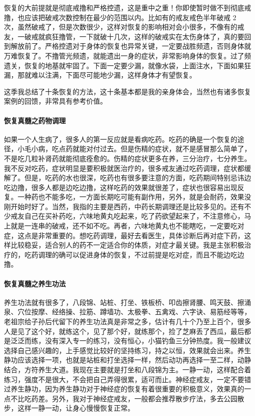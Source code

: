 恢复的大前提就是彻底戒撸和严格控遗，这是重中之重！你即使暂时做不到彻底戒撸，也应该把破戒次数控制在最少的范围以内。比如有的戒友戒色半年破戒 2 次，虽然破戒了，但是次数很少，这样对恢复的影响相对会小很多，不像有的戒友，一破戒就疯狂撸管，一下就破十几次，这样的破戒实在太伤身体了，真的要回到解放前了。严格控遗对于身体的恢复也异常关键，一定要战胜频遗，否则身体就万难恢复了。不撸管光频遗，就能遗出一身的症状，非常影响身体的恢复。过了频遗关，恢复的地基就牢固了。下面一定要少漏，就像水袋，上面注水，下面如果狂漏，那就难以注满，下面尽可能地少漏，这样身体才有望恢复。

这季我总结了十条恢复的方法，这十条基本都是我的亲身体会，当然也有诸多恢复案例的回馈，非常具有参考价值。

\paragraph{恢复真髓之药物调理}

如果一个人生病了，很多人的第一反应就是看病吃药。吃药的确是一个恢复的途径，小毛小病，吃点药就能对付过去。但是伤精的症状，就不是感冒那么简单了，不是吃几粒补肾药就能彻底痊愈的。伤精的症状更多在养，三分治疗，七分养生。我不反对吃药，症状明显是要积极就医治疗的，很多戒友通过吃药调理，症状都缓解了。但是，吃药的水也很深，吃药也有很多要注意的方面，吃药期间特别忌讳边吃边撸，很多人都是边吃边撸，这样吃药的效果就很差了，症状也很容易出现反复。一种药也不能多吃，一方面长期吃可能有副作用，另外，就是会耐药，效果没刚开始时好了。当然，我指的主要是西药，中药长期调理还是比较多见的。还有不少戒友自己在买补药吃，六味地黄丸吃起来，吃了药欲望起来了，不注意修心，马上就是一连串的破戒，还不如不吃。再者，六味地黄丸也不能瞎吃，一定要吃对症，这点是非常重要的。想吃药调理，最好去看医生，具体诊断后再对症下药，这样比较稳妥，适合别人的药不一定适合你的体质，对症才最关键。我是主张积极治疗的，吃药调理的确可以促进身体的恢复，不过前提是吃对症，而且不能边吃边撸。

\paragraph{恢复真髓之养生功法}

养生功法就有很多了，八段锦、站桩、打坐、铁板桥、叩齿擦肾腰、鸣天鼓、擦涌泉、穴位按摩、经络操、拉筋、蹲墙功、太极拳、五禽戏、六字诀、易筋经等等，老祖宗给子孙后代留下的养生功法真是非常之多，估计有几十个乃至上百个，很多人是见了这个好，就练这个，见了那个好，就练那个，捡了芝麻丢了西瓜，最后都是泛泛而练，没有深入专一的练习，没有恒心，小猫钓鱼三分钟热度。我一般建议选择自己感兴趣的，上手感觉比较好的坚持练习，持之以恒，效果就会出来。养生静功应该选择一项，也就是站桩和打坐选择一样，然后动功再选择一至二样，动静结合，方符养生大道。我现在主要就是打坐和八段锦为主。一静一动，这样配合着练习，强度不是很大，不会把自己弄得很累，适可而止。神经症戒友，一定不要错过养生静功，因为养生静功对于神经症的恢复有着很重要的积极意义，效果真的一点不比吃药差。另外，我对于神经症戒友，一般都会推荐散步疗法，多去公园散步，这样一静一动，让身心慢慢恢复正常。

